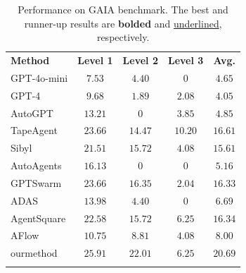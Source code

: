 \begin{table}[!t]
\caption{Performance on GAIA benchmark. {The best and runner-up results are \textbf{bolded} and \underline{underlined}, respectively.}}
\label{tab:rq1_gaia}
\renewcommand\tabcolsep{8pt}
\renewcommand\arraystretch{1.1}
\centering
  \footnotesize
\begin{tabular}{l|cccc}
    \Xhline{1.2pt}
    \rowcolor{CadetBlue!20}
    \textbf{Method} & \textbf{Level 1} & \textbf{Level 2} & \textbf{Level 3}& \textbf{Avg.} \\
    \Xhline{1pt}
    GPT-4o-mini  & $7.53$ & $4.40$ & $0$ & $4.65$\\
   \rowcolor{gray!10} GPT-4 & $9.68$ & $1.89$ & $2.08$ & $4.05$ \\
    \hline
    AutoGPT & $13.21$ & $0$ & $3.85$ & $4.85$\\
    \rowcolor{gray!10}TapeAgent & \underline{$23.66$} & $14.47$ & $\mathbf{10.20}$ & $16.61$ \\
   Sibyl & $21.51$ & $15.72$ & $4.08$  & $15.61$\\
    \hline
    \rowcolor{gray!10}AutoAgents & $16.13$ & $0$ & $0$ & $5.16$  \\
    GPTSwarm & $23.66$ & $16.35$ & $2.04$ &  \underline{$16.33$}\\
    \rowcolor{gray!10}ADAS & $13.98$ & $4.40$ & $0$ & $6.69$ \\
    AgentSquare & $22.58$ & $15.72$ & $6.25$ & \underline{$16.34$} \\
    \rowcolor{gray!10}AFlow & $10.75$ & $8.81$ & $4.08$ & $8.00$  \\

    \hline
    ourmethod  & \textbf{$\mathbf{25.91}$} & \textbf{$\mathbf{22.01}$} & \underline{$6.25$} &  $\mathbf{20.69}$ \\
    \Xhline{1.2pt}
\end{tabular}
  \vspace{-0.9em}
\vspace{-1.em}
\end{table}

